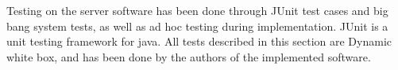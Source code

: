 Testing on the server software has been done through JUnit test cases and big bang system tests, as well as ad hoc testing during implementation.
JUnit is a unit testing framework for java. All tests described in this section are Dynamic white box, and has been done by the authors of the implemented software.


